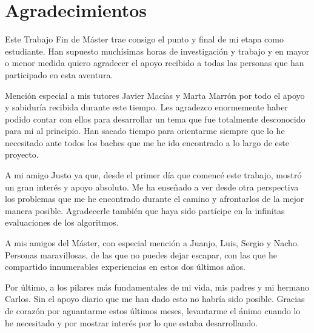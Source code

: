
\chapter*{Agradecimientos}
\label{cha:agradecimientos}

Este Trabajo Fin de Máster trae consigo el punto y final de mi etapa como estudiante. Han supuesto muchísimas horas de investigación y trabajo y en mayor o menor medida quiero agradecer el apoyo recibido a todas las personas que han participado en esta aventura.

Mención especial a mis tutores Javier Macías y Marta Marrón por todo el apoyo y sabiduría recibida durante este tiempo. Les agradezco enormemente haber podido contar con ellos para desarrollar un tema que fue totalmente desconocido para mi al principio. Han sacado tiempo para orientarme siempre que lo he necesitado ante todos los baches que me he ido encontrado a lo largo de este proyecto.

A mi amigo Justo ya que, desde el primer día que comencé este trabajo, mostró un gran interés y apoyo absoluto. Me ha enseñado a ver desde otra perspectiva los problemas que me he encontrado durante el camino y afrontarlos de la mejor manera posible. Agradecerle también que haya sido partícipe en la infinitas evaluaciones de los algoritmos.

A mis amigos del Máster, con especial mención a Juanjo, Luis, Sergio y Nacho. Personas maravillosas, de las que no puedes dejar escapar, con las que he compartido innumerables experiencias en estos dos últimos años.

Por último, a los pilares más fundamentales de mi vida, mis padres y mi hermano Carlos. Sin el apoyo diario que me han dado esto no habría sido posible. Gracias de corazón por aguantarme estos últimos meses, levantarme el ánimo cuando lo he necesitado y por mostrar interés por lo que estaba desarrollando. 